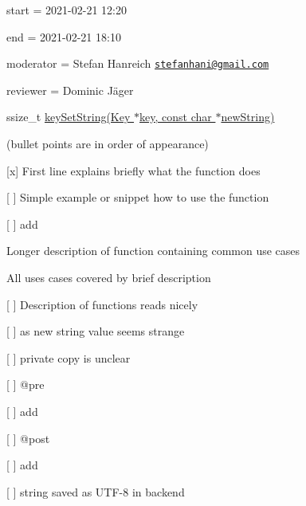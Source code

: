 
\begin{DoxyItemize}
\item start = 2021-\/02-\/21 12\+:20
\item end = 2021-\/02-\/21 18\+:10
\item moderator = Stefan Hanreich \href{mailto:stefanhani@gmail.com}{\tt stefanhani@gmail.\+com}
\item reviewer = Dominic Jäger
\end{DoxyItemize}

{\ttfamily ssize\+\_\+t \hyperlink{group__keyvalue_ga622bde1eb0e0c4994728331326340ef2}{key\+Set\+String(\+Key $\ast$key, const char $\ast$new\+String)}}

(bullet points are in order of appearance)


\begin{DoxyItemize}
\item \mbox{[}x\mbox{]} First line explains briefly what the function does
\item \mbox{[} \mbox{]} Simple example or snippet how to use the function
\begin{DoxyItemize}
\item \mbox{[} \mbox{]} add
\end{DoxyItemize}
\item Longer description of function containing common use cases
\begin{DoxyItemize}
\item All uses cases covered by brief description
\end{DoxyItemize}
\item \mbox{[} \mbox{]} Description of functions reads nicely
\begin{DoxyItemize}
\item \mbox{[} \mbox{]} \textquotesingle{}as new string value\textquotesingle{} seems strange
\item \mbox{[} \mbox{]} \textquotesingle{}private copy\textquotesingle{} is unclear
\end{DoxyItemize}
\item \mbox{[} \mbox{]} {\ttfamily @pre}
\begin{DoxyItemize}
\item \mbox{[} \mbox{]} add
\end{DoxyItemize}
\item \mbox{[} \mbox{]} {\ttfamily @post}
\begin{DoxyItemize}
\item \mbox{[} \mbox{]} add
\item \mbox{[} \mbox{]} string saved as U\+T\+F-\/8 in backend

\end{DoxyItemize}
\end{DoxyItemize}
